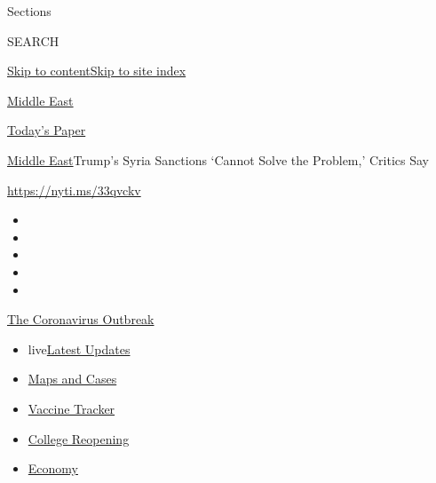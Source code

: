 Sections

SEARCH

\protect\hyperlink{site-content}{Skip to
content}\protect\hyperlink{site-index}{Skip to site index}

\href{https://www.nytimes3xbfgragh.onion/section/world/middleeast}{Middle
East}

\href{https://myaccount.nytimes3xbfgragh.onion/auth/login?response_type=cookie\&client_id=vi}{}

\href{https://www.nytimes3xbfgragh.onion/section/todayspaper}{Today's
Paper}

\href{/section/world/middleeast}{Middle East}\textbar{}Trump's Syria
Sanctions `Cannot Solve the Problem,' Critics Say

\url{https://nyti.ms/33qvckv}

\begin{itemize}
\item
\item
\item
\item
\item
\end{itemize}

\href{https://www.nytimes3xbfgragh.onion/news-event/coronavirus?action=click\&pgtype=Article\&state=default\&region=TOP_BANNER\&context=storylines_menu}{The
Coronavirus Outbreak}

\begin{itemize}
\tightlist
\item
  live\href{https://www.nytimes3xbfgragh.onion/2020/08/04/world/coronavirus-cases.html?action=click\&pgtype=Article\&state=default\&region=TOP_BANNER\&context=storylines_menu}{Latest
  Updates}
\item
  \href{https://www.nytimes3xbfgragh.onion/interactive/2020/us/coronavirus-us-cases.html?action=click\&pgtype=Article\&state=default\&region=TOP_BANNER\&context=storylines_menu}{Maps
  and Cases}
\item
  \href{https://www.nytimes3xbfgragh.onion/interactive/2020/science/coronavirus-vaccine-tracker.html?action=click\&pgtype=Article\&state=default\&region=TOP_BANNER\&context=storylines_menu}{Vaccine
  Tracker}
\item
  \href{https://www.nytimes3xbfgragh.onion/2020/08/02/us/covid-college-reopening.html?action=click\&pgtype=Article\&state=default\&region=TOP_BANNER\&context=storylines_menu}{College
  Reopening}
\item
  \href{https://www.nytimes3xbfgragh.onion/live/2020/08/04/business/stock-market-today-coronavirus?action=click\&pgtype=Article\&state=default\&region=TOP_BANNER\&context=storylines_menu}{Economy}
\end{itemize}

